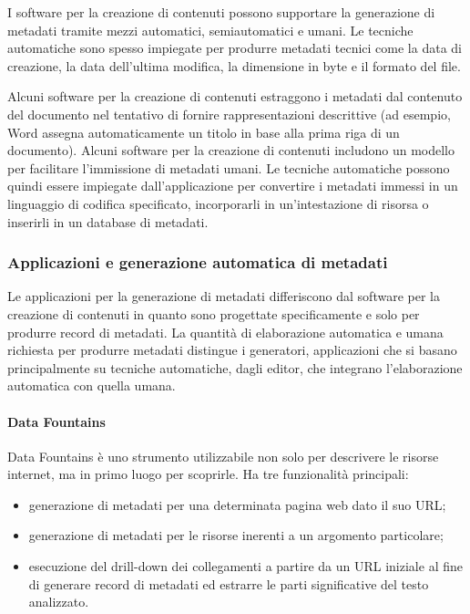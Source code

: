 I software per la creazione di contenuti possono supportare la generazione di metadati tramite mezzi automatici, semiautomatici e umani. Le tecniche automatiche sono spesso impiegate per produrre metadati tecnici come la data di creazione, la data dell'ultima modifica, la dimensione in byte e il formato del file.

Alcuni software per la creazione di contenuti estraggono i metadati dal contenuto del documento nel tentativo di fornire rappresentazioni descrittive (ad esempio, Word assegna automaticamente un titolo in base alla prima riga di un documento). Alcuni software per la creazione di contenuti includono un modello per facilitare l'immissione di metadati umani. Le tecniche automatiche possono quindi essere impiegate dall'applicazione per convertire i metadati immessi in un linguaggio di codifica specificato, incorporarli in un'intestazione di risorsa o inserirli in un database di metadati.

\subsubsection{Applicazioni e generazione automatica di metadati}
Le applicazioni per la generazione di metadati differiscono dal software per la creazione di contenuti in quanto sono progettate specificamente e solo per produrre record di metadati. 
La quantità di elaborazione automatica e umana richiesta per produrre metadati distingue i generatori, applicazioni che si basano principalmente su tecniche automatiche, dagli editor, che integrano l'elaborazione automatica con quella umana.

\paragraph{Data Fountains}
Data Fountains è uno strumento utilizzabile non solo per descrivere le risorse internet, ma in primo luogo per scoprirle. Ha tre funzionalità principali:

\begin{itemize}
\item generazione di metadati per una determinata pagina web dato il suo URL;
\item generazione di metadati per le risorse inerenti a un argomento particolare;
\item esecuzione del drill-down dei collegamenti a partire da un URL iniziale al fine di generare record di metadati ed estrarre le parti significative del testo analizzato.
\end{itemize}

